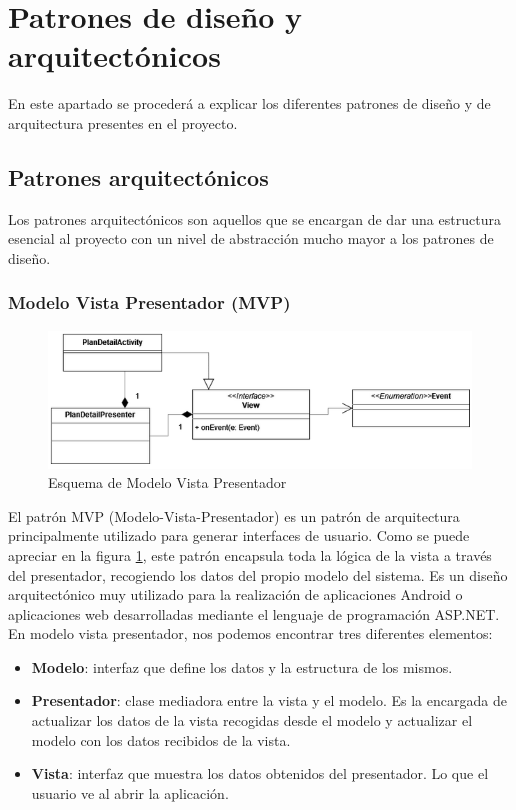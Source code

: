 \section{Patrones de diseño y arquitectónicos}
En este apartado se procederá a explicar los diferentes patrones de diseño y de arquitectura presentes en el proyecto.

\subsection{Patrones arquitectónicos}
Los patrones arquitectónicos \cite{Dessign_patterns} son aquellos que se encargan de dar una estructura esencial al proyecto con un nivel de abstracción mucho mayor a los patrones de diseño.

\subsubsection{\textbf{Modelo Vista Presentador (MVP)}}
\begin{figure}[H]
    \centering
    \includegraphics[width=\textwidth]{Images/Capitulo6/modelomvp.png}
    \caption{Esquema de Modelo Vista Presentador}
    \label{fig:esquemamvp}
\end{figure}

El patrón MVP (Modelo-Vista-Presentador) es un patrón de arquitectura principalmente utilizado para generar interfaces de usuario. Como se puede apreciar en la figura \ref{fig:esquemamvp}, este patrón encapsula toda la lógica de la vista a través del presentador, recogiendo los datos del propio modelo del sistema.
Es un diseño arquitectónico muy utilizado para la realización de aplicaciones Android o aplicaciones web desarrolladas mediante el lenguaje de programación ASP.NET.
En modelo vista presentador, nos podemos encontrar tres diferentes elementos:
\begin{itemize}
    \item \textbf{Modelo}: interfaz que define los datos y la estructura de los mismos.
    \item \textbf{Presentador}: clase mediadora entre la vista y el modelo. Es la encargada de actualizar los datos de la vista recogidas desde el modelo y actualizar el modelo con los datos recibidos de la vista.
    \item \textbf{Vista}: interfaz que muestra los datos obtenidos del presentador. Lo que el usuario ve al abrir la aplicación.
\end{itemize}

